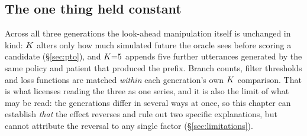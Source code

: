 \subsection{The one thing held constant}
Across all three generations the look-ahead manipulation itself is unchanged in kind: $K$
alters only how much simulated future the oracle sees before scoring a candidate
(\S\ref{sec:pto}), and $K{=}5$ appends five further utterances generated by the same policy
and patient that produced the prefix. Branch counts, filter thresholds and loss functions are
matched \emph{within} each generation's own $K$ comparison. That is what licenses reading the
three as one series, and it is also the limit of what may be read: the generations differ in
several ways at once, so this chapter can establish \emph{that} the effect reverses and rule out
two specific explanations, but cannot attribute the reversal to any single factor
(\S\ref{sec:limitations}).
